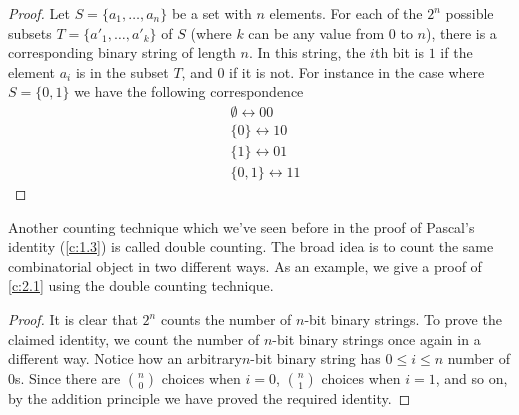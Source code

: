 \begin{proof}
	Let \( S = \{a_1, \ldots, a_n\} \) be a set with \( n \) elements. For each of the \( 2^n \) possible subsets \( T = \{a'_1, \ldots, a'_k\} \) of \( S \) (where \( k \) can be any value from 0 to \( n \)), there is a corresponding binary string of length \( n \). In this string, the \( i \)th bit is \( 1 \) if the element \( a_i \) is in the subset \( T \), and \( 0 \) if it is not. For instance in the case where $S=\{0,1\}$ we have the following correspondence
	 \begin{align*}
		&\emptyset \longleftrightarrow 00 \\
		&\{0\} \longleftrightarrow 10 \\
		&\{1\} \longleftrightarrow 01 \\
		&\{0,1\} \longleftrightarrow 11
	\end{align*}
\end{proof}
Another counting technique which we've seen before in the proof of Pascal's identity (\cref{c:1.3}) is called double counting. The broad idea is to count the same combinatorial object in two different ways. As an example, we give a proof of \cref{c:2.1} using the double counting technique.
\begin{proof}
It is clear that $2^n$ counts the number of $n$-bit binary strings. To prove the claimed identity, we count the number of $n$-bit binary strings once again in a different way. Notice how an arbitrary$n$-bit binary string has $0\leq i\leq n$ number of $0$s. Since there are $\binom{n}{0}$ choices when $i=0$, $\binom{n}{1}$ choices when $i=1$, and so on, by the addition principle we have proved the required identity.
\end{proof}

